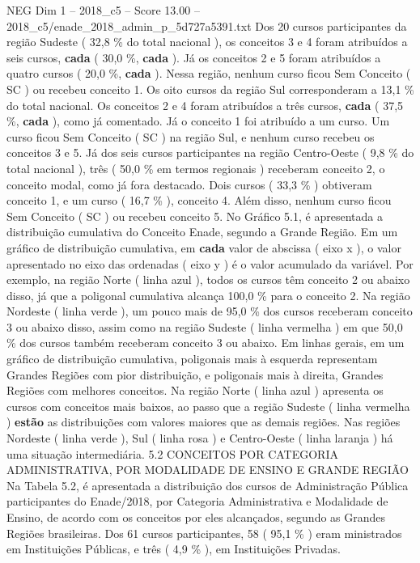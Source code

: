\begin{textsample}{NEG Dim 1 – 2018\_c5 – Score 13.00 – 2018\_c5/enade\_2018\_admin\_p\_5d727a5391.txt}
Dos 20 cursos participantes da região Sudeste ( 32,8 \% do total nacional ), os conceitos 3 e 4 foram atribuídos a seis cursos, \textbf{cada} ( 30,0 \%, \textbf{cada} ).
Já os conceitos 2 e 5 foram atribuídos a quatro cursos ( 20,0 \%, \textbf{cada} ).
Nessa região, nenhum curso ficou Sem Conceito ( SC ) ou recebeu conceito 1.
Os oito cursos da região Sul corresponderam a 13,1 \% do total nacional.
Os conceitos 2 e 4 foram atribuídos a três cursos, \textbf{cada} ( 37,5 \%, \textbf{cada} ), como já comentado.
Já o conceito 1 foi atribuído a um curso.
Um curso ficou Sem Conceito ( SC ) na região Sul, e nenhum curso recebeu os conceitos 3 e 5.
Já dos seis cursos participantes na região Centro-Oeste ( 9,8 \% do total nacional ), três ( 50,0 \% em termos regionais ) receberam conceito 2, o conceito modal, como já fora destacado.
Dois cursos ( 33,3 \% ) obtiveram conceito 1, e um curso ( 16,7 \% ), conceito 4.
Além disso, nenhum curso ficou Sem Conceito ( SC ) ou recebeu conceito 5.
No Gráfico 5.1, é apresentada a distribuição cumulativa do Conceito Enade, segundo a Grande Região.
Em um gráfico de distribuição cumulativa, em \textbf{cada} valor de abscissa ( eixo x ), o valor apresentado no eixo das ordenadas ( eixo y ) é o valor acumulado da variável.
Por exemplo, na região Norte ( linha azul ), todos os cursos têm conceito 2 ou abaixo disso, já que a poligonal cumulativa alcança 100,0 \% para o conceito 2.
Na região Nordeste ( linha verde ), um pouco mais de 95,0 \% dos cursos receberam conceito 3 ou abaixo disso, assim como na região Sudeste ( linha vermelha ) em que 50,0 \% dos cursos também receberam conceito 3 ou abaixo.
Em linhas gerais, em um gráfico de distribuição cumulativa, poligonais mais à esquerda representam Grandes Regiões com pior distribuição, e poligonais mais à direita, Grandes Regiões com melhores conceitos.
Na região Norte ( linha azul ) apresenta os cursos com conceitos mais baixos, ao passo que a região Sudeste ( linha vermelha ) \textbf{estão} as distribuições com valores maiores que as demais regiões.
Nas regiões Nordeste ( linha verde ), Sul ( linha rosa ) e Centro-Oeste ( linha laranja ) há uma situação intermediária. 5.2 CONCEITOS POR CATEGORIA ADMINISTRATIVA, POR MODALIDADE DE ENSINO E GRANDE REGIÃO Na Tabela 5.2, é apresentada a distribuição dos cursos de Administração Pública participantes do Enade/2018, por Categoria Administrativa e Modalidade de Ensino, de acordo com os conceitos por eles alcançados, segundo as Grandes Regiões brasileiras.
Dos 61 cursos participantes, 58 ( 95,1 \% ) eram ministrados em Instituições Públicas, e três ( 4,9 \% ), em Instituições Privadas.

\end{textsample}
